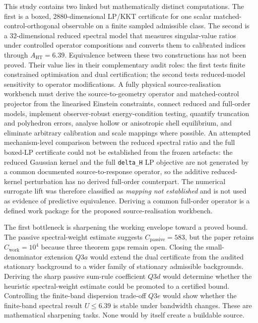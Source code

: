 \documentclass[11pt,a4paper]{article}
\begin{document}
This study contains two linked but mathematically distinct computations. The first is a boxed, $2880$-dimensional LP/KKT certificate for one scalar matched-control-orthogonal observable on a finite sampled admissible class. The second is a $32$-dimensional reduced spectral model that measures singular-value ratios under controlled operator compositions and converts them to calibrated indices through $A_{\mathrm{HT}}=6.39$. Equivalence between these two constructions has not been proved. Their value lies in their complementary audit roles: the first tests finite constrained optimisation and dual certification; the second tests reduced-model sensitivity to operator modifications. A fully physical source-realisation workbench must derive the source-to-geometry operator and matched-control projector from the linearised Einstein constraints, connect reduced and full-order models, implement observer-robust energy-condition testing, quantify truncation and polyhedron errors, analyse hollow or anisotropic shell equilibrium, and eliminate arbitrary calibration and scale mappings where possible. An attempted mechanism-level comparison between the reduced spectral ratio and the full boxed-LP certificate could not be established from the frozen artefacts: the reduced Gaussian kernel and the full \texttt{delta\_H} LP objective are not generated by a common documented source-to-response operator, so the additive reduced-kernel perturbation has no derived full-order counterpart. The numerical surrogate lift was therefore classified as \emph{mapping not established} and is not used as evidence of predictive equivalence. Deriving a common full-order operator is a defined work package for the proposed source-realisation workbench.

The first bottleneck is sharpening the working envelope toward a proved bound. The passive spectral-weight estimate suggests $C_{\mathrm{passive}}=583$, but the paper retains $C_{\mathrm{work}}=10^{4}$ because three theorem gaps remain open. Closing the small-denominator extension $Q3a$ would extend the dual certificate from the audited stationary background to a wider family of stationary admissible backgrounds. Deriving the sharp passive sum-rule coefficient $Q3d$ would determine whether the heuristic spectral-weight estimate could be promoted to a certified bound. Controlling the finite-band dispersion trade-off $Q3e$ would show whether the finite-band spectral result $U\leq6.39$ is stable under bandwidth changes. These are mathematical sharpening tasks. None would by itself create a buildable source.
\end{document}
